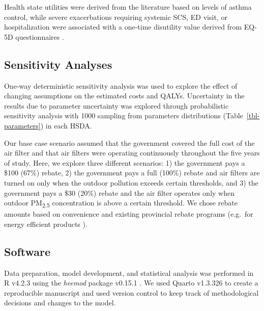 \documentclass[
  number]{elsarticle}
\begin{document}
Health state utilities were derived from the literature based on levels
of asthma control, while severe exacerbations requiring systemic SCS, ED
visit, or hospitalization were associated with a one-time disutility
value derived from EQ-5D questionnaires \citep{lloyd2007}.

\hypertarget{sensitivity-analyses}{%
\subsection{Sensitivity Analyses}\label{sensitivity-analyses}}

One-way deterministic sensitivity analysis was used to explore the
effect of changing assumptions on the estimated costs and QALYs.
Uncertainty in the results due to parameter uncertainty was explored
through probabilistic sensitivity analysis with 1000 sampling from
parameters distributions (Table~\ref{tbl-parameters}) in each HSDA.

Our base case scenario assumed that the government covered the full cost
of the air filter and that air filters were operating continuously
throughout the five years of study. Here, we explore three different
scenarios: 1) the government pays a \$100 (67\%) rebate, 2) the
government pays a full (100\%) rebate and air filters are turned on only
when the outdoor pollution exceeds certain thresholds, and 3) the
government pays a \$30 (20\%) rebate and the air filter operates only
when outdoor PM\textsubscript{2.5} concentration is above a certain
threshold. We chose rebate amounts based on convenience and existing
provincial rebate programs (e.g.~for energy efficient products
\citep{bchydro}).

\hypertarget{software}{%
\subsection{Software}\label{software}}

Data preparation, model development, and statistical analysis was
performed in R v4.2.3 using the \emph{heemod} package v0.15.1
\citep{filipovic-pierucci2016}. We used Quarto v1.3.326 to create a
reproducible manuscript and used version control to keep track of
methodological decisions and changes to the model.
\end{document}
